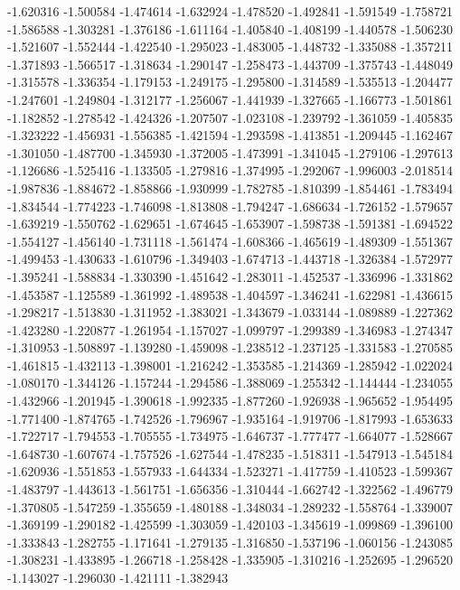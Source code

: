 -1.620316
-1.500584
-1.474614
-1.632924
-1.478520
-1.492841
-1.591549
-1.758721
-1.586588
-1.303281
-1.376186
-1.611164
-1.405840
-1.408199
-1.440578
-1.506230
-1.521607
-1.552444
-1.422540
-1.295023
-1.483005
-1.448732
-1.335088
-1.357211
-1.371893
-1.566517
-1.318634
-1.290147
-1.258473
-1.443709
-1.375743
-1.448049
-1.315578
-1.336354
-1.179153
-1.249175
-1.295800
-1.314589
-1.535513
-1.204477
-1.247601
-1.249804
-1.312177
-1.256067
-1.441939
-1.327665
-1.166773
-1.501861
-1.182852
-1.278542
-1.424326
-1.207507
-1.023108
-1.239792
-1.361059
-1.405835
-1.323222
-1.456931
-1.556385
-1.421594
-1.293598
-1.413851
-1.209445
-1.162467
-1.301050
-1.487700
-1.345930
-1.372005
-1.473991
-1.341045
-1.279106
-1.297613
-1.126686
-1.525416
-1.133505
-1.279816
-1.374995
-1.292067
-1.996003
-2.018514
-1.987836
-1.884672
-1.858866
-1.930999
-1.782785
-1.810399
-1.854461
-1.783494
-1.834544
-1.774223
-1.746098
-1.813808
-1.794247
-1.686634
-1.726152
-1.579657
-1.639219
-1.550762
-1.629651
-1.674645
-1.653907
-1.598738
-1.591381
-1.694522
-1.554127
-1.456140
-1.731118
-1.561474
-1.608366
-1.465619
-1.489309
-1.551367
-1.499453
-1.430633
-1.610796
-1.349403
-1.674713
-1.443718
-1.326384
-1.572977
-1.395241
-1.588834
-1.330390
-1.451642
-1.283011
-1.452537
-1.336996
-1.331862
-1.453587
-1.125589
-1.361992
-1.489538
-1.404597
-1.346241
-1.622981
-1.436615
-1.298217
-1.513830
-1.311952
-1.383021
-1.343679
-1.033144
-1.089889
-1.227362
-1.423280
-1.220877
-1.261954
-1.157027
-1.099797
-1.299389
-1.346983
-1.274347
-1.310953
-1.508897
-1.139280
-1.459098
-1.238512
-1.237125
-1.331583
-1.270585
-1.461815
-1.432113
-1.398001
-1.216242
-1.353585
-1.214369
-1.285942
-1.022024
-1.080170
-1.344126
-1.157244
-1.294586
-1.388069
-1.255342
-1.144444
-1.234055
-1.432966
-1.201945
-1.390618
-1.992335
-1.877260
-1.926938
-1.965652
-1.954495
-1.771400
-1.874765
-1.742526
-1.796967
-1.935164
-1.919706
-1.817993
-1.653633
-1.722717
-1.794553
-1.705555
-1.734975
-1.646737
-1.777477
-1.664077
-1.528667
-1.648730
-1.607674
-1.757526
-1.627544
-1.478235
-1.518311
-1.547913
-1.545184
-1.620936
-1.551853
-1.557933
-1.644334
-1.523271
-1.417759
-1.410523
-1.599367
-1.483797
-1.443613
-1.561751
-1.656356
-1.310444
-1.662742
-1.322562
-1.496779
-1.370805
-1.547259
-1.355659
-1.480188
-1.348034
-1.289232
-1.558764
-1.339007
-1.369199
-1.290182
-1.425599
-1.303059
-1.420103
-1.345619
-1.099869
-1.396100
-1.333843
-1.282755
-1.171641
-1.279135
-1.316850
-1.537196
-1.060156
-1.243085
-1.308231
-1.433895
-1.266718
-1.258428
-1.335905
-1.310216
-1.252695
-1.296520
-1.143027
-1.296030
-1.421111
-1.382943
